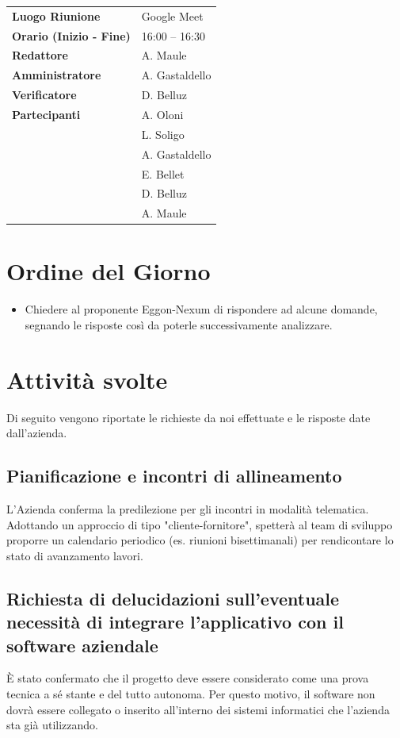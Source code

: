 \documentclass[a4paper,12pt]{article}
\begin{document}
\begin{tabular}{>{\bfseries}p{5cm} | p{10cm}}
Luogo Riunione & Google Meet \\[6pt]

Orario (Inizio - Fine) & 16:00 -- 16:30 \\[6pt]

Redattore &
  A. Maule\\[6pt]

Amministratore & 
A. Gastaldello\\[6pt]

Verificatore &
D. Belluz\\[6pt]

Partecipanti &
  A. Oloni\\ &
  L. Soligo\\&
  A. Gastaldello\\&
  E. Bellet\\&
  D. Belluz\\&
  A. Maule\\[6pt]
  
\end{tabular}

\section{Ordine del Giorno}
    \begin{itemize}
    \item  Chiedere al proponente Eggon-Nexum di rispondere ad alcune 
domande, segnando le risposte così da poterle successivamente analizzare.
    \end{itemize}

\section{Attività svolte}
Di seguito vengono riportate le richieste da noi effettuate e le risposte date dall'azienda.
\subsection{Pianificazione e incontri di allineamento}
L'Azienda conferma la predilezione per gli incontri in modalità telematica. Adottando un approccio di tipo "cliente-fornitore", spetterà al team di sviluppo proporre un calendario periodico (es. riunioni bisettimanali) per rendicontare lo stato di avanzamento lavori.
\subsection{Richiesta di delucidazioni sull'eventuale necessità di integrare l'applicativo con il software aziendale}
È stato confermato che il progetto deve essere considerato come una prova tecnica a sé stante e del tutto autonoma. Per questo motivo, il software non dovrà essere collegato o inserito all'interno dei sistemi informatici che l'azienda sta già utilizzando.
\end{document}

